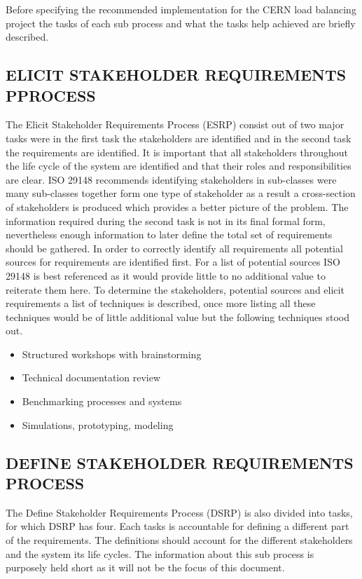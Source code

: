 \documentclass[conference]{IEEEtran}
\begin{document}
Before specifying the recommended implementation for the CERN load balancing project the tasks of each sub process and what the tasks help achieved are briefly described.

\subsection{ELICIT STAKEHOLDER REQUIREMENTS PPROCESS}

The Elicit Stakeholder Requirements Process (ESRP) consist out of two major tasks were in the first task the stakeholders are identified and in the second task the requirements are identified. It is important that all stakeholders throughout the life cycle of the system are identified and that their roles and responsibilities are clear. ISO 29148 recommends identifying stakeholders in sub-classes were many sub-classes together form one type of stakeholder as a result a cross-section of stakeholders is produced which provides a better picture of the problem. The information required during the second task is not in its final formal form, nevertheless enough information to later define the total set of requirements should be gathered. In order to correctly identify all requirements all potential sources for requirements are identified first. For a list of potential sources ISO 29148 is best referenced as it would provide little to no additional value to reiterate them here. To determine the stakeholders, potential sources and elicit requirements a list of techniques is described, once more listing all these techniques would be of little additional value but the following techniques stood out.

\begin{itemize}
	\item Structured workshops with brainstorming
	\item Technical documentation review
	\item Benchmarking processes and systems
	\item Simulations, prototyping, modeling
\end{itemize}

\subsection{DEFINE STAKEHOLDER REQUIREMENTS PROCESS}

The Define Stakeholder Requirements Process (DSRP) is also divided into tasks, for which DSRP has four. Each tasks is accountable for defining a different part of the requirements. The definitions should account for the different stakeholders and the system its life cycles. The information about this sub process is purposely held short as it will not be the focus of this document.
\end{document}
